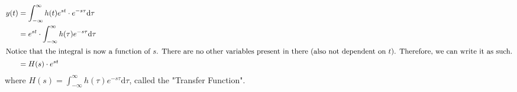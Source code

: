 \documentclass[10pt]{article}
\begin{document}
\begin{align*}
    y(t) &= \int_{-\infty}^\infty h(t) e^{st} \cdot e^{-s\tau} \text{d}\tau\\
    &= e^{st} \cdot \int_{-\infty}^\infty h(\tau) e^{-s\tau} \text{d}\tau\\
    \intertext{Notice that the integral is now a function of $s$.  There are no other variables present in there (also not dependent on $t$).  Therefore, we can write it as such.}
    &= H(s) \cdot e^{st}
\end{align*}
where $H(s) = \int_{-\infty}^\infty h(\tau) e^{-s\tau} \text{d}\tau$, called the "Transfer Function".
\end{document}
